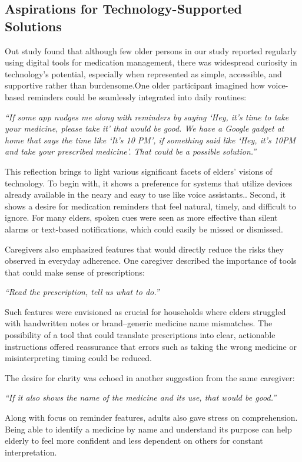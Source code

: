 \documentclass[acmlarge]{acmart}
\begin{document}
\subsection{Aspirations for Technology-Supported Solutions}
Out study found that although few older persons in our study reported
regularly using digital tools for medication management, there was
widespread curiosity in technology's potential, especially when
represented as simple, accessible, and supportive rather than
burdensome.One older participant imagined how voice-based reminders
could be seamlessly integrated into daily routines:

\emph{``If some app nudges me along with reminders by saying `Hey, it's
time to take your medicine, please take it' that would be good. We have
a Google gadget at home that says the time like `It's 10 PM', if
something said like `Hey, it's 10PM and take your prescribed medicine'.
That could be a possible solution.''}

This reflection brings to light various significant facets of elders'
visions of technology. To begin with, it shows a preference for systems
that utilize devices already available in the neary and easy to use like
voice assistants.. Second, it shows a desire for medication reminders
that feel natural, timely, and difficult to ignore. For many elders,
spoken cues were seen as more effective than silent alarms or text-based
notifications, which could easily be missed or dismissed.

Caregivers also emphasized features that would directly reduce the risks
they observed in everyday adherence. One caregiver described the
importance of tools that could make sense of prescriptions:

\emph{``Read the prescription, tell us what to do.''}

Such features were envisioned as crucial for households where elders
struggled with handwritten notes or brand--generic medicine name
mismatches. The possibility of a tool that could translate prescriptions
into clear, actionable instructions offered reassurance that errors such
as taking the wrong medicine or misinterpreting timing could be reduced.

The desire for clarity was echoed in another suggestion from the same
caregiver:

\emph{``If it also shows the name of the medicine and its use, that
would be good.''}

Along with focus on reminder features, adults also gave stress on
comprehension. Being able to identify a medicine by name and understand
its purpose can help elderly to feel more confident and less dependent
on others for constant interpretation.
\end{document}
